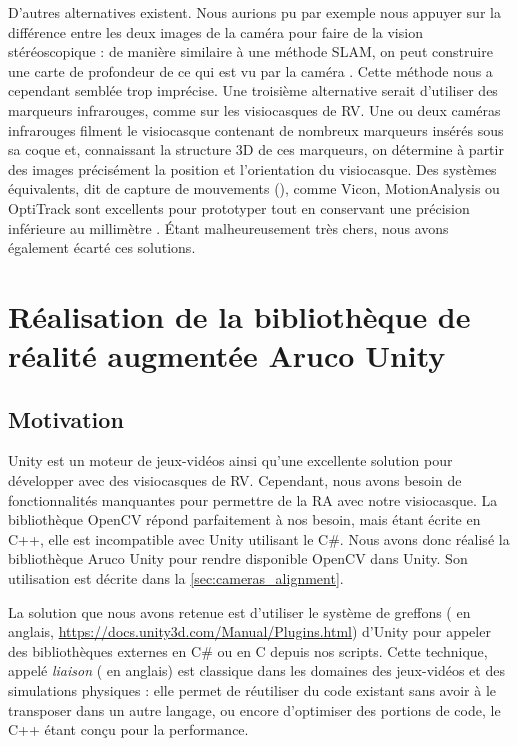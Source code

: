 D'autres alternatives existent. Nous aurions pu par exemple nous appuyer sur la différence entre les deux images de la caméra pour faire de la vision stéréoscopique : de manière similaire à une méthode SLAM, on peut construire une carte de profondeur de ce qui est vu par la caméra . Cette méthode nous a cependant semblée trop imprécise. Une troisième alternative serait d'utiliser des marqueurs infrarouges, comme sur les visiocasques de RV. Une ou deux caméras infrarouges filment le visiocasque contenant de nombreux marqueurs insérés sous sa coque  et, connaissant la structure 3D de ces marqueurs, on détermine à partir des images précisément la position et l'orientation du visiocasque. Des systèmes équivalents, dit de capture de mouvements (), comme Vicon, MotionAnalysis ou OptiTrack sont excellents pour prototyper tout en conservant une précision inférieure au millimètre . Étant malheureusement très chers, nous avons également écarté ces solutions.


\section{Réalisation de la bibliothèque de réalité augmentée Aruco Unity}
\label{sec:aruco_unity}

\subsection{Motivation}
\label{subsec:aruco_unity_motivation}
Unity est un moteur de jeux-vidéos ainsi qu'une excellente solution pour développer avec des visiocasques de RV. Cependant, nous avons besoin de fonctionnalités manquantes pour permettre de la RA avec notre visiocasque. La bibliothèque OpenCV répond parfaitement à nos besoin, mais étant écrite en C++, elle est incompatible avec Unity utilisant le C\#. Nous avons donc réalisé la bibliothèque Aruco Unity pour rendre disponible OpenCV dans Unity. Son utilisation est décrite dans la \autoref{sec:cameras_alignment}.

La solution que nous avons retenue est d'utiliser le système de greffons ( en anglais, \url{https://docs.unity3d.com/Manual/Plugins.html}) d'Unity pour appeler des bibliothèques externes en C\# ou en C depuis nos scripts. Cette technique, appelé \emph{liaison} ( en anglais) est classique dans les domaines des jeux-vidéos et des simulations physiques : elle permet de réutiliser du code existant sans avoir à le transposer dans un autre langage, ou encore d'optimiser des portions de code, le C++ étant conçu pour la performance.

